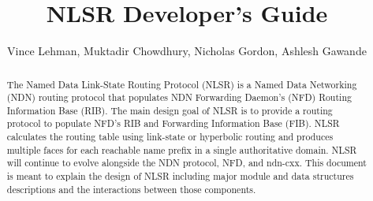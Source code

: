 \documentclass[10pt]{article}
\title{NLSR Developer's Guide}
\author[1]{Vince Lehman, Muktadir Chowdhury, Nicholas Gordon, Ashlesh Gawande}
\affil[1]{University of Memphis}
\begin{document}
\maketitle

\begin{abstract}
The Named Data Link-State Routing Protocol (NLSR) is a Named Data Networking (NDN) routing protocol that populates NDN Forwarding Daemon's (NFD) Routing Information Base (RIB).
The main design goal of NLSR is to provide a routing protocol to populate NFD's RIB and Forwarding Information Base (FIB).
NLSR calculates the routing table using link-state or hyperbolic routing and produces multiple faces for each reachable name prefix in a single authoritative domain.
NLSR will continue to evolve alongside the NDN protocol, NFD, and ndn-cxx.
This document is meant to explain the design of NLSR including major module and data structures descriptions and the interactions between those components.

\end{abstract}

\tableofcontents
\clearpage


\clearpage

\clearpage

\clearpage

\clearpage

\clearpage

\clearpage

\clearpage

\clearpage

\clearpage

\clearpage

\clearpage

\clearpage

\clearpage

{}



\end{document}
